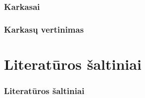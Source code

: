 \documentclass[12pt]{beamer}
\begin{document}
\begin{frame}
    \frametitle{Karkasai}
\end{frame}

\begin{frame}
    \frametitle{Karkasų vertinimas}
\end{frame}


\section{Literatūros šaltiniai}
\begin{frame}[t,allowframebreaks]
    \frametitle{Literatūros šaltiniai}
    \printbibliography
\end{frame}
\end{document}

